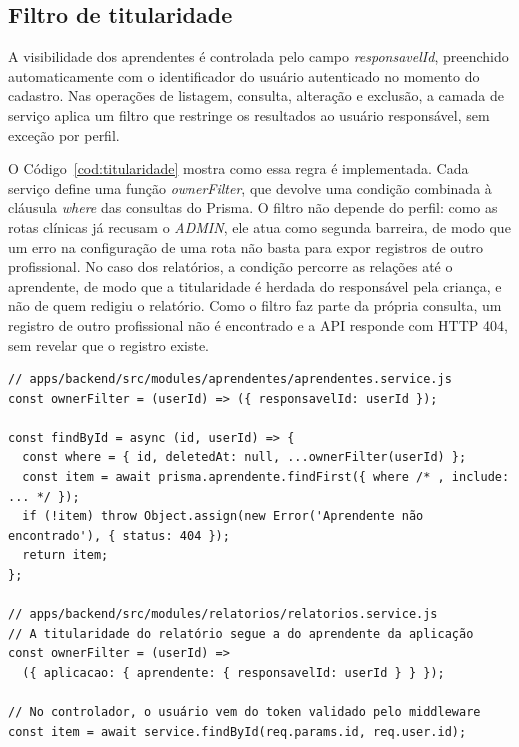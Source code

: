 \subsection{Filtro de titularidade}\label{sec:titularidade}

A visibilidade dos aprendentes é controlada pelo campo \textit{responsavelId}, preenchido automaticamente com o identificador do usuário autenticado no momento do cadastro. Nas operações de listagem, consulta, alteração e exclusão, a camada de serviço aplica um filtro que restringe os resultados ao usuário responsável, sem exceção por perfil.

O Código~\ref{cod:titularidade} mostra como essa regra é implementada. Cada serviço define uma função \textit{ownerFilter}, que devolve uma condição combinada à cláusula \textit{where} das consultas do Prisma. O filtro não depende do perfil: como as rotas clínicas já recusam o \textit{ADMIN}, ele atua como segunda barreira, de modo que um erro na configuração de uma rota não basta para expor registros de outro profissional. No caso dos relatórios, a condição percorre as relações até o aprendente, de modo que a titularidade é herdada do responsável pela criança, e não de quem redigiu o relatório. Como o filtro faz parte da própria consulta, um registro de outro profissional não é encontrado e a API responde com HTTP 404, sem revelar que o registro existe.

\begin{lstlisting}[caption={Filtro de titularidade aplicado nas consultas de aprendentes e relatórios},label={cod:titularidade}]
// apps/backend/src/modules/aprendentes/aprendentes.service.js
const ownerFilter = (userId) => ({ responsavelId: userId });

const findById = async (id, userId) => {
  const where = { id, deletedAt: null, ...ownerFilter(userId) };
  const item = await prisma.aprendente.findFirst({ where /* , include: ... */ });
  if (!item) throw Object.assign(new Error('Aprendente não encontrado'), { status: 404 });
  return item;
};

// apps/backend/src/modules/relatorios/relatorios.service.js
// A titularidade do relatório segue a do aprendente da aplicação
const ownerFilter = (userId) =>
  ({ aplicacao: { aprendente: { responsavelId: userId } } });

// No controlador, o usuário vem do token validado pelo middleware
const item = await service.findById(req.params.id, req.user.id);
\end{lstlisting}

